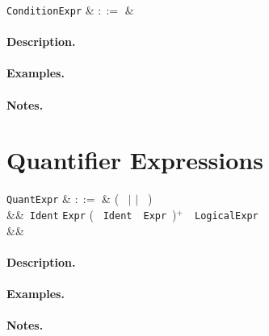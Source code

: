 \begin{syntax}
  \verb+ConditionExpr+ & $::=$ &\\
\end{syntax}

\paragraph{Description.}

\paragraph{Examples.}

\paragraph{Notes.} 


\section{Quantifier Expressions}
\label{c_expr_quantifier}

\begin{syntax}
\verb+QuantExpr+ & $::=$ & \big(\  $|$  $|$
\ \big)\ \token{\{}\\
&&\ \verb+Ident+  \verb+Expr+ \big( \token{,}\ \verb+Ident+\
\ \verb+Expr+\ \big)$^+$\ \token{|}\ \verb+LogicalExpr+\\
&& \token{\}}\\
\end{syntax}

\paragraph{Description.}

\paragraph{Examples.}

\paragraph{Notes.} 


